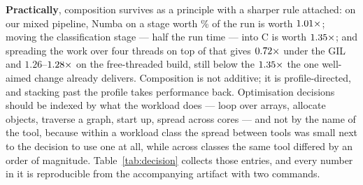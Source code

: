 \textbf{Practically}, composition survives as a principle with a sharper rule attached: on our
mixed pipeline, Numba on a stage worth \% of the run is worth $\meas{ratio:b7_pipeline-gil:end_to_end/gil/v0_pure|b7_pipeline-gil:end_to_end/gil/v1_numba}{1.01}\times$; moving the
classification stage --- half the run time --- into C is worth $\meas{ratio:b7_pipeline-gil:end_to_end/gil/v0_pure|b7_pipeline-gil:end_to_end/gil/v2_numba_native}{1.35}\times$; and spreading the work over
four threads on top of that gives $\meas{ratio:b7_pipeline-gil:end_to_end/gil/v0_pure|b7_pipeline-gil:end_to_end/gil/v3_native_threads}{0.72}\times$ under the GIL and $1.26$--$\meas{ratio:b7_pipeline-ft:end_to_end/ft/v0_pure|b7_pipeline-ft:end_to_end/ft/v3_native_threads}{1.28}\times$ on the
free-threaded build, still below the $\meas{ratio:b7_pipeline-gil:end_to_end/gil/v0_pure|b7_pipeline-gil:end_to_end/gil/v2_numba_native}{1.35}\times$ the one well-aimed change already
delivers. Composition is not additive; it is profile-directed, and stacking past the profile
takes performance back. Optimisation decisions should be indexed by what the workload
does --- loop over arrays, allocate objects, traverse a graph, start up, spread across cores ---
and not by the name of the tool, because within a workload class the spread between tools
was small next to the decision to use one at all, while across classes the same tool differed by
an order of magnitude.
Table~\ref{tab:decision} collects those entries, and every number in it is reproducible from the
accompanying artifact with two commands.

